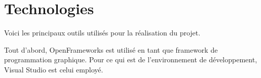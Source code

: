 
%
%

\chapter{Technologies}

Voici les principaux outils utilisés pour la réalisation du projet.

Tout d'abord, OpenFrameworks est utilisé en tant que framework de programmation graphique. Pour ce qui est de l'environnement de développement, Visual Studio est celui employé. 